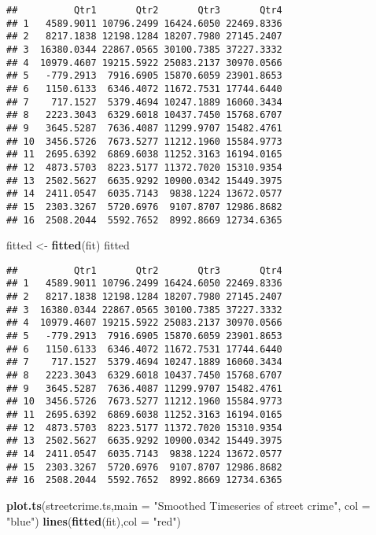 \documentclass[]{article}
\newenvironment{Shaded}{\begin{snugshade}}{\end{snugshade}}
\newcommand{\DataTypeTok}[1]{\textcolor[rgb]{0.13,0.29,0.53}{#1}}
\newcommand{\KeywordTok}[1]{\textcolor[rgb]{0.13,0.29,0.53}{\textbf{#1}}}
\newcommand{\NormalTok}[1]{#1}
\newcommand{\StringTok}[1]{\textcolor[rgb]{0.31,0.60,0.02}{#1}}
\begin{document}
\begin{verbatim}
##          Qtr1       Qtr2       Qtr3       Qtr4
## 1   4589.9011 10796.2499 16424.6050 22469.8336
## 2   8217.1838 12198.1284 18207.7980 27145.2407
## 3  16380.0344 22867.0565 30100.7385 37227.3332
## 4  10979.4607 19215.5922 25083.2137 30970.0566
## 5   -779.2913  7916.6905 15870.6059 23901.8653
## 6   1150.6133  6346.4072 11672.7531 17744.6440
## 7    717.1527  5379.4694 10247.1889 16060.3434
## 8   2223.3043  6329.6018 10437.7450 15768.6707
## 9   3645.5287  7636.4087 11299.9707 15482.4761
## 10  3456.5726  7673.5277 11212.1960 15584.9773
## 11  2695.6392  6869.6038 11252.3163 16194.0165
## 12  4873.5703  8223.5177 11372.7020 15310.9354
## 13  2502.5627  6635.9292 10900.0342 15449.3975
## 14  2411.0547  6035.7143  9838.1224 13672.0577
## 15  2303.3267  5720.6976  9107.8707 12986.8682
## 16  2508.2044  5592.7652  8992.8669 12734.6365
\end{verbatim}

\begin{Shaded}
\begin{Highlighting}[]
\NormalTok{fitted <-}\StringTok{ }\KeywordTok{fitted}\NormalTok{(fit)}
\NormalTok{fitted}
\end{Highlighting}
\end{Shaded}

\begin{verbatim}
##          Qtr1       Qtr2       Qtr3       Qtr4
## 1   4589.9011 10796.2499 16424.6050 22469.8336
## 2   8217.1838 12198.1284 18207.7980 27145.2407
## 3  16380.0344 22867.0565 30100.7385 37227.3332
## 4  10979.4607 19215.5922 25083.2137 30970.0566
## 5   -779.2913  7916.6905 15870.6059 23901.8653
## 6   1150.6133  6346.4072 11672.7531 17744.6440
## 7    717.1527  5379.4694 10247.1889 16060.3434
## 8   2223.3043  6329.6018 10437.7450 15768.6707
## 9   3645.5287  7636.4087 11299.9707 15482.4761
## 10  3456.5726  7673.5277 11212.1960 15584.9773
## 11  2695.6392  6869.6038 11252.3163 16194.0165
## 12  4873.5703  8223.5177 11372.7020 15310.9354
## 13  2502.5627  6635.9292 10900.0342 15449.3975
## 14  2411.0547  6035.7143  9838.1224 13672.0577
## 15  2303.3267  5720.6976  9107.8707 12986.8682
## 16  2508.2044  5592.7652  8992.8669 12734.6365
\end{verbatim}

\begin{Shaded}
\begin{Highlighting}[]
\KeywordTok{plot.ts}\NormalTok{(streetcrime.ts,}\DataTypeTok{main =} \StringTok{"Smoothed Timeseries of street crime"}\NormalTok{, }\DataTypeTok{col =} \StringTok{"blue"}\NormalTok{)}
\KeywordTok{lines}\NormalTok{(}\KeywordTok{fitted}\NormalTok{(fit),}\DataTypeTok{col =} \StringTok{"red"}\NormalTok{)}
\end{Highlighting}
\end{Shaded}
\end{document}
